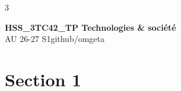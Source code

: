 \documentclass[12pt, a4paper]{article}
\newcommand{\mytitle}{HSS\_3TC42\_TP Technologies \& société}
\newcommand{\myauthor}{github/omgeta}
\newcommand{\mydate}{AU 26-27 S1}
\begin{document}
\raggedright
\footnotesize
\begin{multicols*}{3}
\setlength{\premulticols}{1pt}
\setlength{\postmulticols}{1pt}
\setlength{\multicolsep}{1pt}
\setlength{\columnsep}{2pt}

{\normalsize{\textbf{\mytitle}}}\\
{\footnotesize{\mydate\hspace{2pt}\textemdash\hspace{2pt}\myauthor}}
\section{Section 1}
\end{multicols*}
\end{document}
